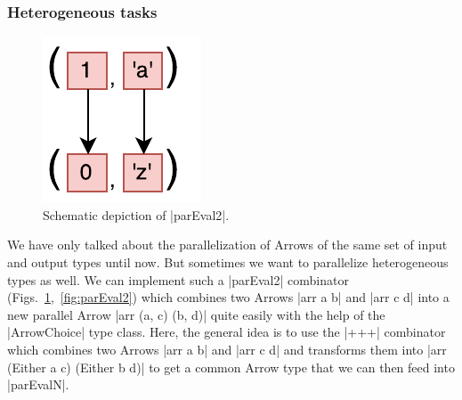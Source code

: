 \subsubsection{Heterogeneous tasks}
\begin{figure}[tb]
	\includegraphics[scale=0.7]{images/parEval2}
	\caption{Schematic depiction of |parEval2|.}
	\label{fig:parEval2Img}
\end{figure}
We have only talked about the parallelization of Arrows of the same set of input and output types until now. But sometimes we want to parallelize heterogeneous types as well. We can implement such a |parEval2| combinator (Figs.~\ref{fig:parEval2Img},~\ref{fig:parEval2}) which combines two Arrows |arr a b| and |arr c d| into a new parallel Arrow |arr (a, c) (b, d)| quite easily with the help of the |ArrowChoice| type class. Here, the general idea is to use the |+++| combinator which combines two Arrows |arr a b| and |arr c d| and transforms them into |arr (Either a c) (Either b d)| to get a common Arrow type that we can then feed into |parEvalN|.

